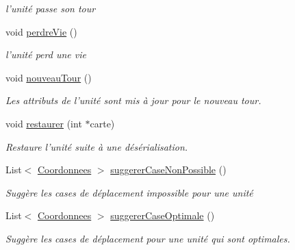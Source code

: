 \begin{DoxyCompactItemize}
\begin{DoxyCompactList}\small\item\em l'unité passe son tour \end{DoxyCompactList}\item 
\hypertarget{interface_small_world_1_1_inter_unite_a106ab0a27d4a228dbcf18c0b26f680b3}{void \hyperlink{interface_small_world_1_1_inter_unite_a106ab0a27d4a228dbcf18c0b26f680b3}{perdre\-Vie} ()}\label{interface_small_world_1_1_inter_unite_a106ab0a27d4a228dbcf18c0b26f680b3}

\begin{DoxyCompactList}\small\item\em l'unité perd une vie \end{DoxyCompactList}\item 
\hypertarget{interface_small_world_1_1_inter_unite_a2c19b9dc612ee1ec4716f9993b78908d}{void \hyperlink{interface_small_world_1_1_inter_unite_a2c19b9dc612ee1ec4716f9993b78908d}{nouveau\-Tour} ()}\label{interface_small_world_1_1_inter_unite_a2c19b9dc612ee1ec4716f9993b78908d}

\begin{DoxyCompactList}\small\item\em Les attributs de l'unité sont mis à jour pour le nouveau tour. \end{DoxyCompactList}\item 
void \hyperlink{interface_small_world_1_1_inter_unite_a554b5ca4373b37e6e5ad29f3a3a381dc}{restaurer} (int $\ast$carte)
\begin{DoxyCompactList}\small\item\em Restaure l'unité suite à une désérialisation. \end{DoxyCompactList}\item 
List$<$ \hyperlink{class_small_world_1_1_coordonnees}{Coordonnees} $>$ \hyperlink{interface_small_world_1_1_inter_unite_a1c5011629159c486f68c015dc940406e}{suggerer\-Case\-Non\-Possible} ()
\begin{DoxyCompactList}\small\item\em Suggère les cases de déplacement impossible pour une unité \end{DoxyCompactList}\item 
List$<$ \hyperlink{class_small_world_1_1_coordonnees}{Coordonnees} $>$ \hyperlink{interface_small_world_1_1_inter_unite_ac0016b4cfb075557c4e2bcc6a1b1876e}{suggerer\-Case\-Optimale} ()
\begin{DoxyCompactList}\small\item\em Suggère les cases de déplacement pour une unité qui sont optimales. \end{DoxyCompactList}\end{DoxyCompactItemize}


